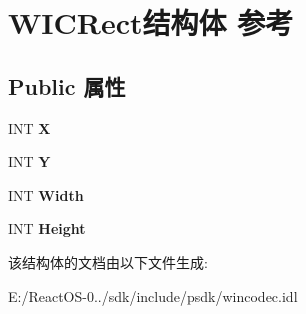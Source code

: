 \hypertarget{struct_w_i_c_rect}{}\section{W\+I\+C\+Rect结构体 参考}
\label{struct_w_i_c_rect}
\subsection*{Public 属性}
\begin{DoxyCompactItemize}
\item 
\mbox{\label{struct_w_i_c_rect_a850c46ba888ab495a110f890c22dc575}} 
I\+NT {\bfseries X}
\item 
\mbox{\label{struct_w_i_c_rect_a3dede575455196601ba8ae8d80a85cf4}} 
I\+NT {\bfseries Y}
\item 
\mbox{\label{struct_w_i_c_rect_a18f584f12a0417306006198b55179419}} 
I\+NT {\bfseries Width}
\item 
\mbox{\label{struct_w_i_c_rect_a15e3b41cd347fe8fa33ef781994ccb36}} 
I\+NT {\bfseries Height}
\end{DoxyCompactItemize}


该结构体的文档由以下文件生成\+:\begin{DoxyCompactItemize}
\item 
E\+:/\+React\+O\+S-\/0../sdk/include/psdk/wincodec.\+idl\end{DoxyCompactItemize}
